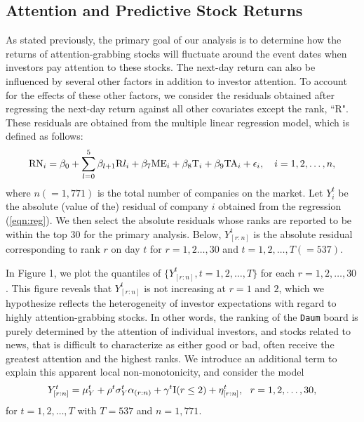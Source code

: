 \documentclass[12pt]{article}
\begin{document}
\subsection{Attention and Predictive Stock Returns} 

As stated previously, the primary goal of our analysis is to determine how the returns of attention-grabbing stocks 
will fluctuate around the event dates when investors pay attention to these stocks. 
The next-day return can also be influenced by several other factors 
in addition to investor attention. To account for the effects of these other factors, we consider 
the residuals obtained after regressing the next-day return against all other covariates except the rank, ``R". 
These residuals are obtained from the multiple linear regression model, which is defined as follows:
\begin{equation} \label{eqn:reg}
{\rm RN}_i= \beta_0 + \sum_{l=0}^5 \beta_{l+1} {\rm R}l_i + \beta_7 {\rm ME}_i  + \beta_8 {\rm T}_i 
+\beta_9 {\rm TA}_i  + \epsilon_i, \quad i=1,2,\ldots,n,  
\end{equation}
where $n (=1,771)$ is the total number of companies on the market. Let $Y_{i}^t$ be the absolute 
(value of the) residual of company $i$ obtained from the regression (\ref{eqn:reg}).
We then select the absolute residuals 
whose ranks are reported to be within the top 30 for the primary analysis. Below, 
$Y_{[r:n]}^t$ is the absolute residual
 corresponding to rank $r$ on day $t$ for $r=1,2\ldots,30$ and $t=1,2,\ldots,T (=537)$. 


In Figure 1, we plot the quantiles of $\big\{Y_{[r:n]}^t, t=1,2,\ldots,T\big\}$ for 
each $r=1,2,\ldots,30$. This figure reveals 
that $Y_{[r:n]}^t$ is not increasing at $r=1$ and $2$, which we hypothesize reflects 
the heterogeneity of investor expectations with regard to highly 
attention-grabbing stocks. In other words, 
the ranking of the \texttt{Daum} board is purely determined by the attention 
of individual investors, and stocks related to news, 
that is difficult to characterize as either good or bad, often receive
 the greatest attention and the highest ranks. 
We introduce an additional term to explain 
this apparent local non-monotonicity, and 
consider the model
\begin{equation}
\label{eqn:model-realdata}
Y_{[r:n]}^t = \mu_Y^t + \rho^t \sigma_Y^t  \alpha_{(r:n)} + \gamma^t {\rm I}(r \leq 2) + \eta_{[r:n]}^t, ~~ r = 1, 2, \ldots, 30,
\end{equation}
for $t= 1,2, \ldots, T$ with $T=537$ and $n=1,771$.
\end{document}
